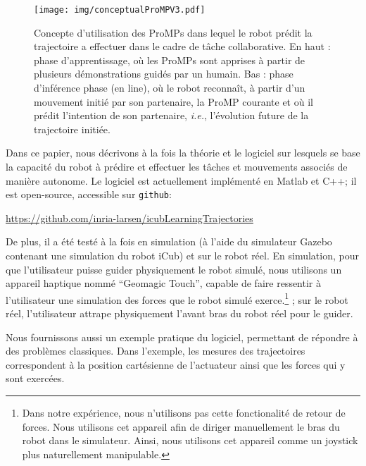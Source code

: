 \documentclass[utf8]{frontiersSCNS} %
\newcommand{\todo}[1]{\textcolor{red}{\textbf{/*#1*/}}}
\begin{document}
\begin{figure}[ht]
\centering
\texttt{[image: img/conceptualProMPV3.pdf]}
\caption{Concepte d'utilisation des ProMPs dans lequel le robot prédit la trajectoire a effectuer dans le cadre de tâche collaborative. En haut : phase d'apprentissage, où les ProMPs sont apprises à partir de plusieurs démonstrations guidés par un humain. Bas : phase d'inférence phase (en line),  où le robot reconnaît, à partir d'un mouvement initié par son partenaire, la ProMP courante et où il prédit l'intention de son partenaire, \textit{i.e.}, l'évolution future de la trajectoire initiée.}
\label{fig:conceptProMP}
\end{figure}

Dans ce papier, nous décrivons à la fois la théorie et le logiciel sur lesquels se base la capacité du robot à prédire et effectuer les tâches et mouvements associés de manière autonome.
Le logiciel est actuellement implémenté en Matlab et C++; il est open-source, accessible sur \texttt{github}: %
\begin{center}
\url{https://github.com/inria-larsen/icubLearningTrajectories}
\end{center}
De plus, il a été testé à la fois en simulation (à l'aide du simulateur Gazebo contenant une simulation du robot iCub) et sur le robot réel. En simulation, pour que l'utilisateur puisse guider physiquement le robot simulé, nous utilisons un appareil haptique nommé ``Geomagic Touch'', capable de faire ressentir à l'utilisateur une simulation des forces que le robot simulé exerce.\footnote{Dans notre expérience, nous n'utilisons pas cette fonctionalité de retour de forces. Nous utilisons cet appareil afin de diriger manuellement le bras du robot dans le simulateur. Ainsi, nous utilisons cet appareil comme un joystick plus naturellement manipulable.}
; sur le robot réel, l'utilisateur attrape physiquement l'avant bras du robot réel pour le guider.

Nous fournissons aussi un exemple pratique du logiciel, permettant de répondre à des problèmes classiques.
Dans l'exemple, les mesures des trajectoires correspondent à la position cartésienne de l'actuateur ainsi que les forces qui y sont exercées.
\end{document}
